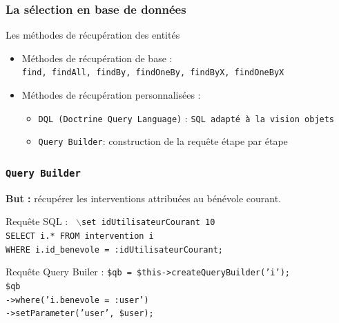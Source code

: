 \begin{frame}
\frametitle{La sélection en base de données}
	\begin{block}{Les méthodes de récupération des entités}
		\begin{itemize}
			\item Méthodes de récupération de base : \\
			 \texttt{find, findAll, findBy, findOneBy, findByX, findOneByX}
			\item Méthodes de récupération personnalisées : \\
			\begin{itemize}
			\item \texttt{DQL (Doctrine Query Language)} : \texttt{SQL adapté à la vision objets}
			\item \texttt{Query Builder}: construction de la requête étape par étape
			\end{itemize}			
		\end{itemize}
	  \end{block}
\end{frame}

\begin{frame}
\frametitle{\texttt{Query Builder}}
	\textbf{But :} récupérer les interventions attribuées au bénévole courant. \\
	\vskip 0.5cm
	\begin{block}{Requête SQL :}	
	\texttt{ 
	\noindent $\backslash$set idUtilisateurCourant 10 \\ 	
	SELECT i.* FROM intervention i \\
	\setlength{\parindent}{1cm}	WHERE i.id\_benevole = :idUtilisateurCourant;}
	\end{block}
	\begin{block}{Requête Query Builer :}
	\noindent \texttt{\$qb = \$this->createQueryBuilder('i'); \\
	\noindent \$qb \\
	\setlength{\parindent}{1cm} ->where('i.benevole = :user') \\
    \setlength{\parindent}{1cm} ->setParameter('user', \$user);}
	\end{block}
\end{frame}

